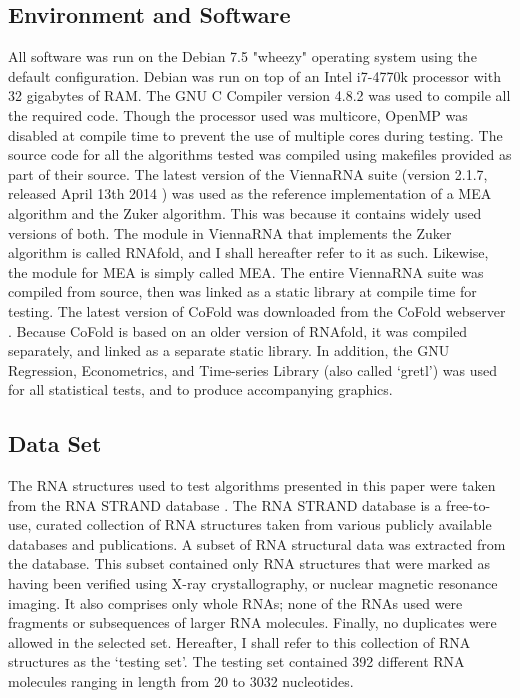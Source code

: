 \documentclass[12pt, a4paper]{article}
\begin{document}
\subsection{Environment and Software}
All software was run on the Debian 7.5 "wheezy" operating system using the default configuration. Debian was run on top of an Intel i7-4770k processor with 32 gigabytes of RAM. The GNU C Compiler version 4.8.2 was used to compile all the required code. Though the processor used was multicore, OpenMP was disabled at compile time to prevent the use of multiple cores during testing. The source code for all the algorithms tested was compiled using makefiles provided as part of their source. The latest version of the ViennaRNA suite \cite{lorenz2011viennarna} (version 2.1.7, released April 13th 2014 \cite{lorenz2014online}) was used as the reference implementation of a MEA algorithm and the Zuker algorithm. This was because it contains widely used versions of both. The module in ViennaRNA that implements the Zuker algorithm is called RNAfold, and I shall hereafter refer to it as such. Likewise, the module for MEA is simply called MEA. The entire ViennaRNA suite was compiled from source, then was linked as a static library at compile time for testing. The latest version of CoFold was downloaded from the CoFold webserver \cite{cofold2014online}. Because CoFold is based on an older version of RNAfold, it was compiled separately, and linked as a separate static library. In addition, the GNU Regression, Econometrics, and Time-series Library \cite{baiocchi2003gretl} (also called `gretl') was used for all statistical tests, and to produce accompanying graphics.

\subsection{Data Set}
The RNA structures used to test algorithms presented in this paper were taken from the RNA STRAND database \cite{andronescu2008rna}. The RNA STRAND database is a free-to-use, curated collection of RNA structures taken from various publicly available databases and publications. A subset of RNA structural data was extracted from the database. This subset contained only RNA structures that were marked as having been verified using X-ray crystallography, or nuclear magnetic resonance imaging. It also comprises only whole RNAs; none of the RNAs used were fragments or subsequences of larger RNA molecules. Finally, no duplicates were allowed in the selected set. Hereafter, I shall refer to this collection of RNA structures as the `testing set'. The testing set contained 392 different RNA molecules ranging in length from 20 to 3032 nucleotides.
\end{document}
